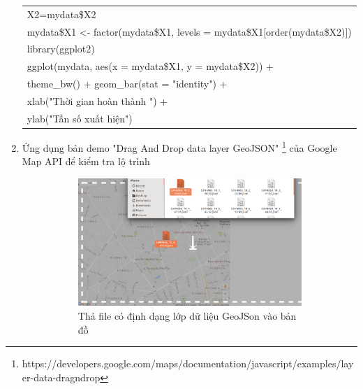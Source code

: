 \documentclass[a4paper, 13pt]{report}
\begin{document}
\begin{enumerate}[label=\textbf{PL\arabic*}]
\begin{flushleft}
\begin{tabular}{ |l| }
X2=mydata\$X2\\
mydata\$X1 <- factor(mydata\$X1, levels = mydata\$X1[order(mydata\$X2)])\\
library(ggplot2)\\
ggplot(mydata, aes(x = mydata\$X1, y = mydata\$X2)) +\\
\hspace{1cm} theme\_bw() + geom\_bar(stat = "identity") + \\
\hspace{1cm} xlab("Thời gian hoàn thành ") +\\
\hspace{1cm} ylab("Tần số xuất hiện") \\
\hline
\end{tabular}
\end{flushleft}
\item \label{DragAndDrop} Ứng dụng bản demo "Drag And Drop data layer GeoJSON" \footnote{https://developers.google.com/maps/documentation/javascript/examples/layer-data-dragndrop} của Google Map API để kiểm tra lộ trình\\
\FloatBarrier
\begin{figure}[h]
\caption{Ứng dụng bản demo "Drag And Drop data layer GeoJSON"}
    \begin{subfigure}[b]{0.4\textwidth}
        \includegraphics[width=\textwidth]{dragAndDrop1.png}
        \caption{Thả file có định dạng lớp dữ liệu GeoJSon vào bản đồ}
    \end{subfigure}
    \begin{subfigure}[b]{0.4\textwidth}

\end{subfigure}
\end{figure}
\end{enumerate}
\end{document}
